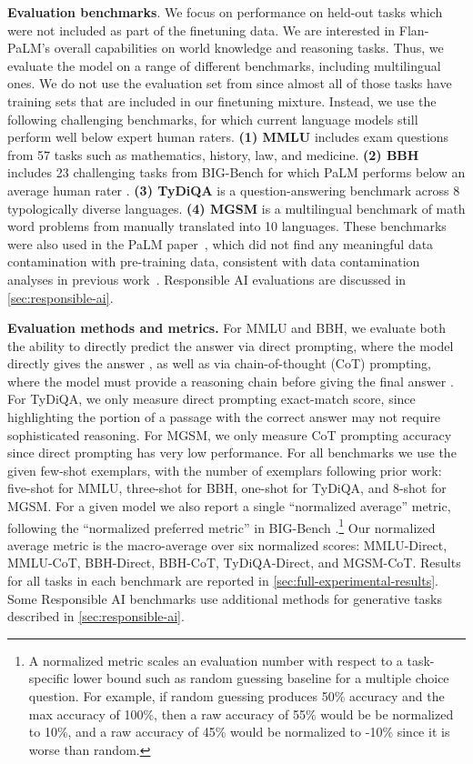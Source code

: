 \textbf{Evaluation benchmarks}. We focus on performance on held-out tasks which were not included as part of the finetuning data. We are interested in Flan-PaLM's overall capabilities on world knowledge and reasoning tasks. Thus, we evaluate the model on a range of different benchmarks, including multilingual ones. We do not use the evaluation set from \citet{brown2020language} since almost all of those tasks have training sets that are included in our finetuning mixture. Instead, we use the following challenging benchmarks, for which current language models still perform well below expert human raters.
\textbf{(1) MMLU} \citep{hendrycks2020measuring} includes exam questions from 57 tasks such as mathematics, history, law, and medicine.
\textbf{(2) BBH} includes 23 challenging tasks from BIG-Bench \citep{bigbench} for which PaLM performs below an average human rater \citep{suzgun2022challenging}.
\textbf{(3) TyDiQA} \citep{clark-etal-2020-tydi} is a question-answering benchmark across 8 typologically diverse languages.
\textbf{(4) MGSM} \citep{shi2022language} is a multilingual benchmark of math word problems from \citet{cobbe2021training} manually translated into 10 languages. These benchmarks were also used in the PaLM paper~\citep{chowdhery2022palm}, which did not find any meaningful data contamination with pre-training data, consistent with data contamination analyses in previous work~\citep{brown2020language,wei2021finetuned,du_glam_2021}. Responsible AI evaluations are discussed in \ref{sec:responsible-ai}.

\textbf{Evaluation methods and metrics.} For MMLU and BBH, we evaluate both the ability to directly predict the answer via direct prompting, where the model directly gives the answer \citep{brown2020language,bigbench}, as well as via chain-of-thought (CoT) prompting, where the model must provide a reasoning chain before giving the final answer \citep{wei2022chain}. For TyDiQA, we only measure direct prompting exact-match score, since highlighting the portion of a passage with the correct answer may not require sophisticated reasoning. For MGSM, we only measure CoT prompting accuracy since direct prompting has very low performance. For all benchmarks we use the given few-shot exemplars, with the number of exemplars following prior work: five-shot for MMLU, three-shot for BBH, one-shot for TyDiQA, and 8-shot for MGSM. For a given model we also report a single ``normalized average'' metric, following the ``normalized preferred metric'' in BIG-Bench \citep{bigbench}.\footnote{A normalized metric scales an evaluation number with respect to a task-specific lower bound such as random guessing baseline for a multiple choice question. For example, if random guessing produces 50\% accuracy and the max accuracy of 100\%, then a raw accuracy of 55\% would be be normalized to 10\%, and a raw accuracy of 45\% would be normalized to -10\% since it is worse than random.} Our normalized average metric is the macro-average over six normalized scores: MMLU-Direct, MMLU-CoT, BBH-Direct, BBH-CoT, TyDiQA-Direct, and MGSM-CoT. Results for all tasks in each benchmark are reported in \ref{sec:full-experimental-results}. Some Responsible AI benchmarks use additional methods for generative tasks described in \ref{sec:responsible-ai}.

